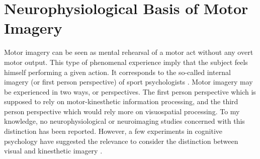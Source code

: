 \documentclass[journal,twocolumn]{IEEEtran}
\begin{document}




\section{Neurophysiological Basis of Motor Imagery} \label{sect:PL}

Motor imagery can be seen as mental rehearsal of a motor act without any overt motor output. This type of phenomenal experience imply that the subject feels himself performing a given action. It corresponds to the so-called internal imagery (or first person perspective) of sport psychologists \cite{landers1983effects}. Motor imagery may be experienced in two ways, or perspectives. The first person perspective which is supposed to rely on motor-kinesthetic information processing, and the third person perspective which would rely more on visuospatial processing. To my knowledge, no neurophysiological or neuroimaging studies concerned with this distinction has been reported. However, a few experiments in cognitive psychology have suggested the relevance to consider the distinction between visual and kinesthetic imagery \cite{denis1985visual}.
\end{document}
